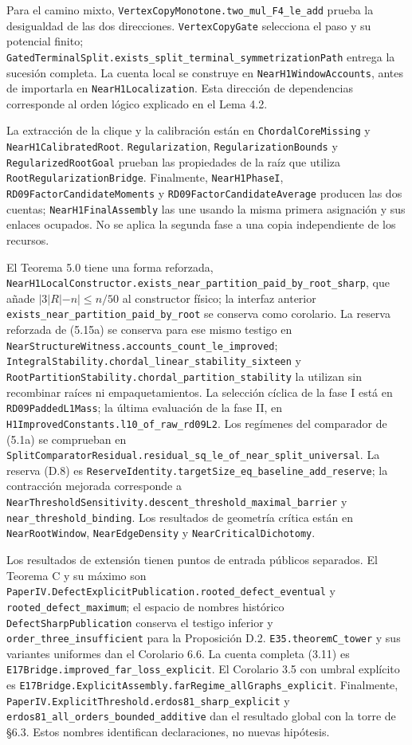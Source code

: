 \documentclass[spanish,11pt,a4paper]{article}
\begin{document}
Para el camino mixto, \nolinkurl{VertexCopyMonotone.two_mul_F4_le_add}
prueba la desigualdad de las dos direcciones. \nolinkurl{VertexCopyGate}
selecciona el paso y su potencial finito;
\nolinkurl{GatedTerminalSplit.exists_split_terminal_symmetrizationPath}
entrega la sucesión completa. La cuenta local se construye en
\nolinkurl{NearH1WindowAccounts}, antes de importarla en
\nolinkurl{NearH1Localization}. Esta dirección de dependencias corresponde
al orden lógico explicado en el Lema 4.2.

La extracción de la clique y la calibración están en
\nolinkurl{ChordalCoreMissing} y \nolinkurl{NearH1CalibratedRoot}.
\nolinkurl{Regularization}, \nolinkurl{RegularizationBounds} y
\nolinkurl{RegularizedRootGoal} prueban las propiedades de la raíz que
utiliza \nolinkurl{RootRegularizationBridge}. Finalmente,
\nolinkurl{NearH1PhaseI}, \nolinkurl{RD09FactorCandidateMoments} y
\nolinkurl{RD09FactorCandidateAverage} producen las dos cuentas;
\nolinkurl{NearH1FinalAssembly} las une usando la misma primera asignación
y sus enlaces ocupados. No se aplica la segunda fase a una copia
independiente de los recursos.

El Teorema 5.0 tiene una forma reforzada,
\nolinkurl{NearH1LocalConstructor.exists_near_partition_paid_by_root_sharp},
que añade \(|3|R|-n|\le n/50\) al constructor físico; la interfaz
anterior \nolinkurl{exists_near_partition_paid_by_root} se conserva
como corolario. La reserva reforzada de (5.15a) se conserva para ese
mismo testigo en
\nolinkurl{NearStructureWitness.accounts_count_le_improved};
\nolinkurl{IntegralStability.chordal_linear_stability_sixteen} y
\nolinkurl{RootPartitionStability.chordal_partition_stability} la
utilizan sin recombinar raíces ni empaquetamientos. La selección cíclica
de la fase I está en \nolinkurl{RD09PaddedL1Mass}; la última evaluación de
la fase II, en \nolinkurl{H1ImprovedConstants.l10_of_raw_rd09L2}. Los
regímenes del comparador de (5.1a) se comprueban en
\nolinkurl{SplitComparatorResidual.residual_sq_le_of_near_split_universal}.
La reserva (D.8) es
\nolinkurl{ReserveIdentity.targetSize_eq_baseline_add_reserve}; la
contracción mejorada corresponde a
\nolinkurl{NearThresholdSensitivity.descent_threshold_maximal_barrier} y
\nolinkurl{near_threshold_binding}. Los resultados de geometría crítica
están en \nolinkurl{NearRootWindow}, \nolinkurl{NearEdgeDensity} y
\nolinkurl{NearCriticalDichotomy}.

Los resultados de extensión tienen puntos de entrada públicos separados.
El Teorema C y su máximo son
\nolinkurl{PaperIV.DefectExplicitPublication.rooted_defect_eventual} y
\nolinkurl{rooted_defect_maximum}; el espacio de nombres histórico
\nolinkurl{DefectSharpPublication} conserva el testigo inferior y
\nolinkurl{order_three_insufficient} para la Proposición D.2.
\nolinkurl{E35.theoremC_tower} y sus variantes uniformes dan el Corolario
6.6. La cuenta completa (3.11) es
\nolinkurl{E17Bridge.improved_far_loss_explicit}. El Corolario 3.5 con
umbral explícito es
\nolinkurl{E17Bridge.ExplicitAssembly.farRegime_allGraphs_explicit}.
Finalmente, \nolinkurl{PaperIV.ExplicitThreshold.erdos81_sharp_explicit}
y \nolinkurl{erdos81_all_orders_bounded_additive} dan el resultado
global con la torre de §6.3. Estos nombres identifican declaraciones, no
nuevas hipótesis.
\end{document}
